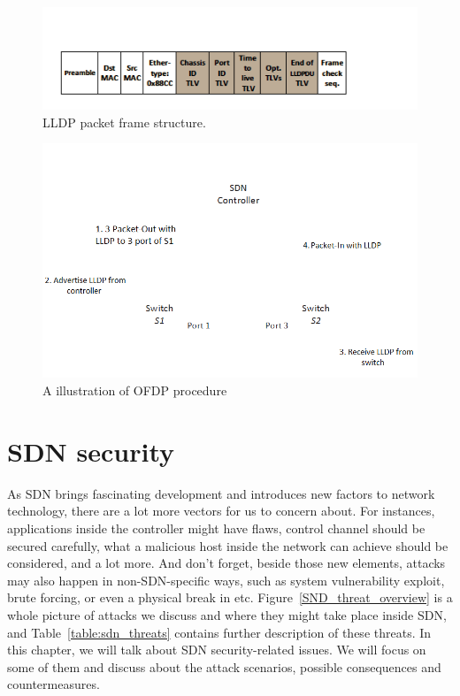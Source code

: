 \begin{figure}[H]
\begin{center} 
\includegraphics[width=1\textwidth]{figures/LLDP_packet_format.png}
\end{center}
\caption{LLDP packet frame structure. \cite{LLDP_WS}}
\label{LLDP_frame}
\end{figure}

\begin{figure}[H]
\begin{center} 
\includegraphics[width=1\textwidth]{figures/OFDP_procedure.png}
\end{center}
\caption{A illustration of OFDP procedure}
\label{OFDP}
\end{figure}

\section{SDN security}
As SDN brings fascinating development and introduces new factors to network technology, there are a lot more vectors for us to concern about. For instances, applications inside the controller might have flaws, control channel should be secured carefully, what a malicious host inside the network can achieve should be considered, and a lot more. And don't forget, beside those new elements, attacks may also happen in non-SDN-specific ways, such as system vulnerability exploit, brute forcing, or even a physical break in etc. Figure~\ref{SND_threat_overview} is a whole picture of attacks we discuss and where they might take place inside SDN, and Table~\ref{table:sdn_threats} contains further description of these threats. In this chapter, we will talk about SDN security-related issues. We will focus on some of them and discuss about the attack scenarios, possible consequences and countermeasures. 

